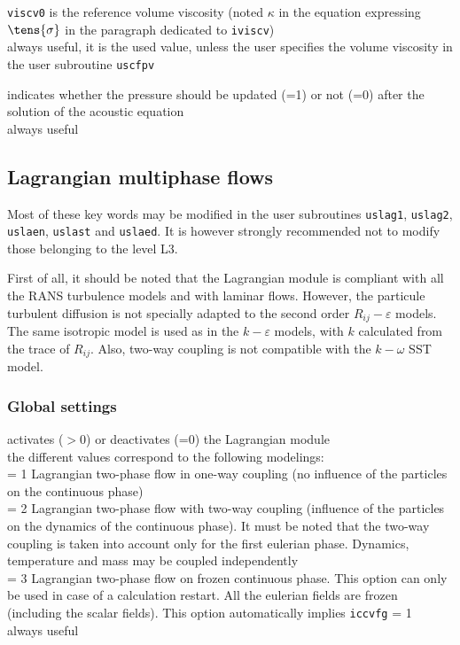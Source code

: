 {\texttt{viscv0} is the reference volume
viscosity (noted $\kappa$ in the equation expressing $\tens{\sigma}$ in the
paragraph dedicated to \texttt{iviscv})\\
always useful, it is the used value, unless the user specifies the volume
viscosity in the user subroutine \texttt{uscfpv}}

{indicates whether the pressure should be updated (=1) or not (=0) after the
solution of the acoustic equation\\
always useful}

\subsection{Lagrangian multiphase flows}
\label{prg_motscles_lagr}

Most of these key words may be modified in the user subroutines
\texttt{uslag1}, \texttt{uslag2}, \texttt{uslaen},
\texttt{uslast} and \texttt{uslaed}. It is however strongly recommended
not to modify those belonging to the level L3.

First of all, it should be noted that the Lagrangian module is compliant with
all the RANS turbulence models and with laminar flows. However, the particule
turbulent diffusion is not specially adapted to the second order
$R_{ij}-\varepsilon$ models. The same isotropic model is used as in the
$k-\varepsilon$ models, with $k$ calculated from the trace of $R_{ij}$. Also,
two-way coupling is not compatible with the $k-\omega$ SST model.


\subsubsection{Global settings}

{activates ($>$0) or deactivates (=0) the Lagrangian module\\
the different values correspond to the following modelings: \\
\hspace*{1.3cm} = 1 Lagrangian two-phase flow in one-way coupling (no influence of
the particles on the continuous phase)\\
\hspace*{1.3cm} = 2 Lagrangian two-phase flow with two-way coupling (influence of
the particles on the dynamics of the continuous phase).
It must be noted that the two-way coupling is taken
into account only for the first eulerian phase. Dynamics,
temperature and mass may be coupled independently\\
\hspace*{1.3cm} = 3 Lagrangian two-phase flow on frozen continuous phase. This option can
only be used in case of a calculation restart. All the
eulerian fields are frozen (including the scalar fields). This option
automatically implies \texttt{iccvfg} = 1\\
always useful}

